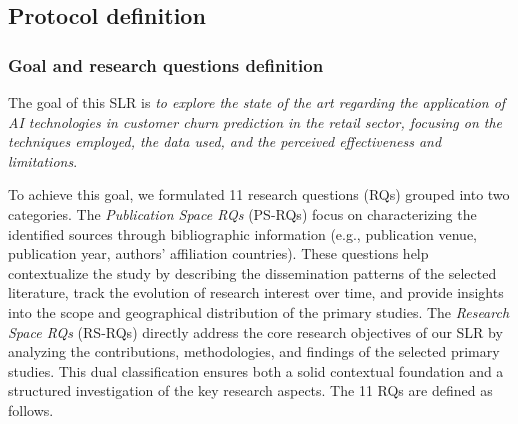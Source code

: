 \documentclass[preprint,12pt]{elsarticle}
\begin{document}

\subsection{Protocol definition}
\label{subsec:protocol-definition}

\subsubsection{Goal and research questions definition} 
The goal of this SLR is \textit{to explore the state of the art regarding the application of AI technologies in customer churn prediction in the retail sector, focusing on the techniques employed, the data used, and the perceived effectiveness and limitations}. 

To achieve this goal, we formulated 11 research questions (RQs) grouped into two categories. The \textit{Publication Space RQs} (PS-RQs) focus on characterizing the identified sources through bibliographic information (e.g., publication venue, publication year, authors' affiliation countries). These questions help contextualize the study by describing the dissemination patterns of the selected literature, track the evolution of research interest over time, and provide insights into the scope and geographical distribution of the primary studies.  
The \textit{Research Space RQs} (RS-RQs) directly address the core research objectives of our SLR by analyzing the contributions, methodologies, and findings of the selected primary studies. This dual classification ensures both a solid contextual foundation and a structured investigation of the key research aspects. The 11 RQs are defined as follows. %
\end{document}
